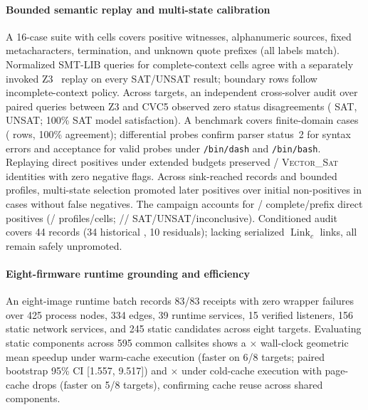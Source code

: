 \paragraph{Bounded semantic replay and multi-state calibration}
A 16-case suite with \TSDSReviewMatrixCells{} cells covers positive witnesses, alphanumeric sources, fixed metacharacters, termination, and unknown quote prefixes (all labels match). Normalized SMT-LIB queries for \TSDSReviewZApplicable{} complete-context cells agree with a separately invoked Z3~\TSDSReviewZVersion{} replay on every SAT/UNSAT result; \TSDSReviewZBoundary{} boundary rows follow incomplete-context policy. Across \TSDSCrossSolverTargets{} targets, an independent cross-solver audit over \TSDSCrossSolverPairs{} paired queries between Z3 and CVC5 observed zero status disagreements (\TSDSCrossSolverSat{} SAT, \TSDSCrossSolverUnsat{} UNSAT; 100\% SAT model satisfaction). A benchmark covers \TSDSReviewSemanticCases{} finite-domain cases (\TSDSReviewSemanticRows{} rows, 100\% agreement); differential probes confirm parser status~2 for \TSDSReviewDashSyntaxErrors{} syntax errors and acceptance for \TSDSReviewDashSyntaxPass{} valid probes under \texttt{/bin/dash} and \texttt{/bin/bash}. Replaying \TSDSHighBudgetTotal{} direct positives under extended budgets preserved \TSDSHighBudgetSatRetained{}/\TSDSHighBudgetTotal{} \textsc{Vector\_Sat} identities with zero negative flags. Across \TSDSMultiStateAuditedRecords{} sink-reached records and \TSDSMultiStateBoundedProfiles{} bounded profiles, multi-state selection promoted later positives over initial non-positives in \TSDSMultiStateLatePositiveSelected{} cases without false negatives. The campaign accounts for \TSDSReviewCampaignDirectSat{}/\TSDSReviewCampaignPrefixSat{} complete/prefix direct positives (\TSDSReviewCampaignProfiles{}/\TSDSReviewCampaignCells{} profiles/cells; \TSDSReviewCampaignVectorSatCells{}/\TSDSReviewCampaignMatrixUnsatCells{}/\TSDSReviewCampaignInconclusiveCells{} SAT/UNSAT/inconclusive). Conditioned audit covers 44 records (34 historical \ctsat{}, 10 residuals); lacking serialized $\operatorname{Link}_c$ links, all remain safely unpromoted.

\paragraph{Eight-firmware runtime grounding and efficiency}
An eight-image runtime batch records 83/83 receipts with zero wrapper failures over 425 process nodes, 334 edges, 39 runtime services, 15 verified listeners, 156 static network services, and 245 static candidates across eight targets. Evaluating static components across 595 common callsites shows a \TSDSReviewFairGeomean{}$\times$ wall-clock geometric mean speedup under warm-cache execution (faster on 6/8 targets; paired bootstrap 95\% CI [1.557, 9.517]) and \TSDSReviewColdGeomean{}$\times$ under cold-cache execution with page-cache drops (faster on 5/8 targets), confirming cache reuse across shared components.

